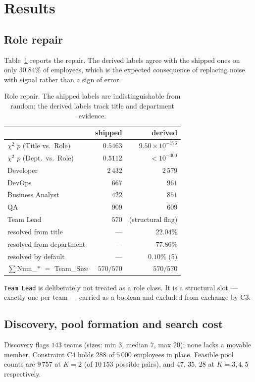 \documentclass[conference]{IEEEtran}
\begin{document}
\section{Results}\label{sec:results}

\subsection{Role repair}
Table~\ref{tab:roles} reports the repair. The derived labels agree with the
shipped ones on only $30.84\%$ of employees, which is the expected consequence of
replacing noise with signal rather than a sign of error.

\begin{table}[t]
\caption{Role repair. The shipped labels are indistinguishable from random; the
derived labels track title and department evidence.}
\label{tab:roles}
\centering\small
\begin{tabular}{lrr}
\toprule
& shipped & derived\\
\midrule
$\chi^2$ $p$ (Title vs.\ Role) & $0.5463$ & $9.50\times10^{-176}$\\
$\chi^2$ $p$ (Dept.\ vs.\ Role) & $0.5112$ & $<10^{-300}$\\
\midrule
Developer & $2\,432$ & $2\,579$\\
DevOps & $667$ & $961$\\
Business Analyst & $422$ & $851$\\
QA & $909$ & $609$\\
Team Lead & $570$ & (structural flag)\\
\midrule
resolved from title & --- & $22.04\%$\\
resolved from department & --- & $77.86\%$\\
resolved by default & --- & $0.10\%$ (5)\\
$\sum$Num\_$*$ $=$ Team\_Size & $570/570$ & $570/570$\\
\bottomrule
\end{tabular}
\end{table}

\texttt{Team Lead} is deliberately not treated as a role class. It is a
structural slot --- exactly one per team --- carried as a boolean and excluded
from exchange by C3.

\subsection{Discovery, pool formation and search cost}
Discovery flags $143$ teams (sizes: min $3$, median $7$, max $20$); none lacks a
movable member. Constraint C4 holds $288$ of $5\,000$ employees in place.
Feasible pool counts are $9\,757$ at $K=2$ (of $10\,153$ possible pairs), and
$47$, $35$, $28$ at $K=3,4,5$ respectively.
\end{document}
